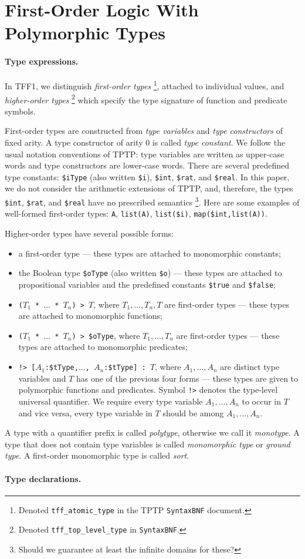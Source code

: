 \section{First-Order Logic With Polymorphic Types} \label{sec_logic}

\paragraph{Type expressions.} In TFF1, we distinguish
{\em first-order types}%
\footnote{Denoted {\tt tff\_atomic\_type} in the
TPTP {\tt SyntaxBNF} document.}, attached to individual values,
and {\em higher-order types}%
\footnote{Denoted {\tt tff\_top\_level\_type} in {\tt SyntaxBNF}.}
which specify the type signature of function and predicate symbols.

First-order types are constructed from {\em type variables\/}
and {\em type constructors\/} of fixed arity. A type constructor
of arity 0 is called {\em type constant}. We follow the usual
notation conventions of TPTP: type variables are written as
upper-case words and type constructors are lower-case words.
There are several predefined type constants:
\verb+$iType+ (also written \verb+$i+),
\verb+$int+, \verb+$rat+, and \verb+$real+. In this paper,
we do not consider the arithmetic extensions of TPTP, and,
therefore, the types \verb+$int+, \verb+$rat+, and \verb+$real+
have no prescribed semantics%
\footnote{Should we guarantee at least the infinite domains for these?}.
Here are some examples of well-formed first-order types:
\verb+A+, \verb+list(A)+, \verb+list($i)+, \verb+map($int,list(A))+.

Higher-order types have several possible forms:
\begin{itemize}
\item a first-order type --- these types are attached to
monomorphic constants;
\item the Boolean type \verb+$oType+ (also written \verb+$o+)
--- these types are attached to propositional variables and
the predefined constants \verb+$true+ and \verb+$false+;
\item {\tt ($T_1$ * $\dots$ * $T_n$) > $T$},
where $T_1,\dots,T_n,T$ are first-order types ---
these types are attached to monomorphic functions;
\item {\tt ($T_1$ * $\dots$ * $T_n$) > \$oType},
where $T_1,\dots,T_n$ are first-order types --- these types
are attached to monomorphic predicates;
\item {\tt !>~[$A_1$:\$tType,$\dots$,%
$A_n$:\$tType]~:~$T$}, where $A_1,\dots,A_n$ are distinct
type variables and $T$ has one of the previous four forms ---
these types are given to polymorphic functions and predicates.
Symbol {\tt !>} denotes the type-level universal quantifier.
We require every type variable $A_1,\dots,A_n$ to occur
in $T$ and vice versa, every type variable in $T$ should be
among $A_1,\dots,A_n$.
\end{itemize}

A type with a quantifier prefix is called {\em polytype},
otherwise we call it {\em monotype}.
A type that does not contain type variables is called
{\em monomorphic type\/} or {\em ground type}.
A first-order monomorphic type is called {\em sort}.

\paragraph{Type declarations.}

